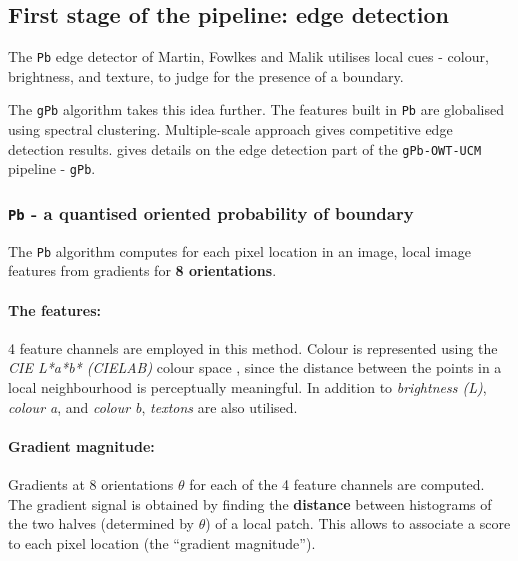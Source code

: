 \subsection{First stage of the pipeline: edge detection} %
\label{sec:ch3-gPb}
The {\tt Pb} edge detector of Martin, Fowlkes and Malik \cite{Martin2004learning} utilises local cues - colour, brightness, and texture, to judge for the presence of a boundary. 

The {\tt gPb} algorithm \cite{Maire2008using} takes this idea further. The features built in {\tt Pb} are globalised using spectral clustering. Multiple-scale approach gives competitive edge detection results.  gives details on the edge detection part of the {\tt gPb-OWT-UCM} pipeline - {\tt gPb}.

\subsubsection{{\tt Pb} - a quantised oriented probability of boundary}
\label{sec:ch3-Pb}
The {\tt Pb}  algorithm computes for each pixel location in an image, local image features from gradients for {\bf 8 orientations}. 

\paragraph{The features:} 4 feature channels are employed in this method. Colour is represented using the \textit{CIE L*a*b* (CIELAB)} colour space \cite{Hoffmann2003cielab}, since the distance between the points in a local neighbourhood is perceptually meaningful. %
In addition to {\it brightness (L)}, {\it colour a}, and {\it colour b}, {\it textons} are also utilised.


\paragraph{Gradient magnitude:} Gradients at 8 orientations $\theta$ for each of the 4 feature channels are computed. The gradient signal is obtained by finding the {\bf distance} %
between histograms of the two halves (determined by $\theta$) of a local patch. This allows to associate a score to each pixel location (the ``gradient magnitude'').


